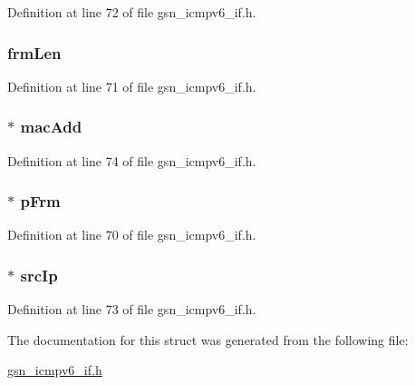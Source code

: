 Definition at line 72 of file gsn\_\-icmpv6\_\-if.h.

\hypertarget{a00201_a2a4cb35bdb3091065000a921b7a482d5}{
\subsubsection[{frmLen}]{ {\bf frmLen}}}
\label{a00201_a2a4cb35bdb3091065000a921b7a482d5}


Definition at line 71 of file gsn\_\-icmpv6\_\-if.h.

\hypertarget{a00201_aae2284ac385006def342fdc83d48d136}{
\subsubsection[{macAdd}]{$\ast$ {\bf macAdd}}}
\label{a00201_aae2284ac385006def342fdc83d48d136}


Definition at line 74 of file gsn\_\-icmpv6\_\-if.h.

\hypertarget{a00201_afba54a5414ca77eb7407764ab9341418}{
\subsubsection[{pFrm}]{$\ast$ {\bf pFrm}}}
\label{a00201_afba54a5414ca77eb7407764ab9341418}


Definition at line 70 of file gsn\_\-icmpv6\_\-if.h.

\hypertarget{a00201_a2be5dd6bedefa93f1b4ea430bf6b92c6}{
\subsubsection[{srcIp}]{$\ast$ {\bf srcIp}}}
\label{a00201_a2be5dd6bedefa93f1b4ea430bf6b92c6}


Definition at line 73 of file gsn\_\-icmpv6\_\-if.h.



The documentation for this struct was generated from the following file:\begin{DoxyCompactItemize}
\item 
\hyperlink{a00517}{gsn\_\-icmpv6\_\-if.h}\end{DoxyCompactItemize}
